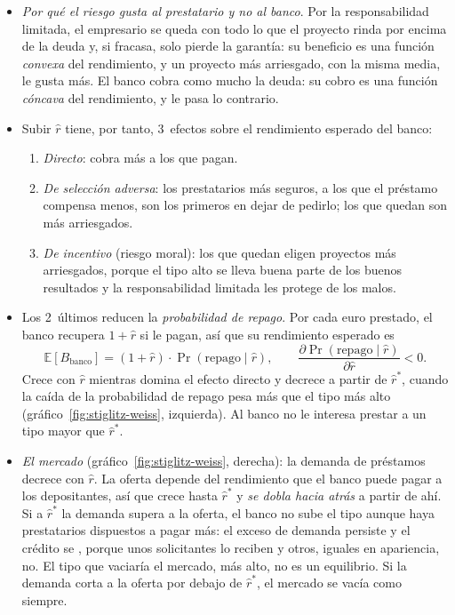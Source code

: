 \documentclass[11pt]{article}
\begin{document}
\begin{itemize}
\item \emph{Por qué el riesgo gusta al prestatario y no al banco}. Por la responsabilidad limitada, el empresario se queda con todo lo que el proyecto rinda por encima de la deuda y, si fracasa, solo pierde la garantía: su beneficio es una función \emph{convexa} del rendimiento, y un proyecto más arriesgado, con la misma media, le gusta más. El banco cobra como mucho la deuda: su cobro es una función \emph{cóncava} del rendimiento, y le pasa lo contrario.
\item Subir $\hat r$ tiene, por tanto, 3~efectos sobre el rendimiento esperado del banco:
  \begin{enumerate}
  \item \emph{Directo}: cobra más a los que pagan.
  \item \emph{De selección adversa}: los prestatarios más seguros, a los que el préstamo compensa menos, son los primeros en dejar de pedirlo; los que quedan son más arriesgados.
  \item \emph{De incentivo} (riesgo moral): los que quedan eligen proyectos más arriesgados, porque el tipo alto se lleva buena parte de los buenos resultados y la responsabilidad limitada les protege de los malos.
  \end{enumerate}
\item Los 2~últimos reducen la \emph{probabilidad de repago}. Por cada euro prestado, el banco recupera $1+\hat r$ si le pagan, así que su rendimiento esperado es
  \begin{equation}
  \mathbb{E}[B_{\mathrm{banco}}]=(1+\hat r)\cdot\Pr(\text{repago}\mid\hat r),\qquad \frac{\partial\Pr(\text{repago}\mid\hat r)}{\partial\hat r}<0 . \label{eq:stiglitz-weiss}
  \end{equation}
  Crece con $\hat r$ mientras domina el efecto directo y decrece a partir de $\hat r^*$, cuando la caída de la probabilidad de repago pesa más que el tipo más alto (gráfico~\ref{fig:stiglitz-weiss}, izquierda). Al banco no le interesa prestar a un tipo mayor que $\hat r^*$.
\item \emph{El mercado} (gráfico~\ref{fig:stiglitz-weiss}, derecha): la demanda de préstamos decrece con $\hat r$. La oferta depende del rendimiento que el banco puede pagar a los depositantes, así que crece hasta $\hat r^*$ y \emph{se dobla hacia atrás} a partir de ahí. Si a $\hat r^*$ la demanda supera a la oferta, el banco no sube el tipo aunque haya prestatarios dispuestos a pagar más: el exceso de demanda persiste y el crédito se , porque unos solicitantes lo reciben y otros, iguales en apariencia, no. El tipo que vaciaría el mercado, más alto, no es un equilibrio. Si la demanda corta a la oferta por debajo de $\hat r^*$, el mercado se vacía como siempre.
\end{itemize}
\end{document}
